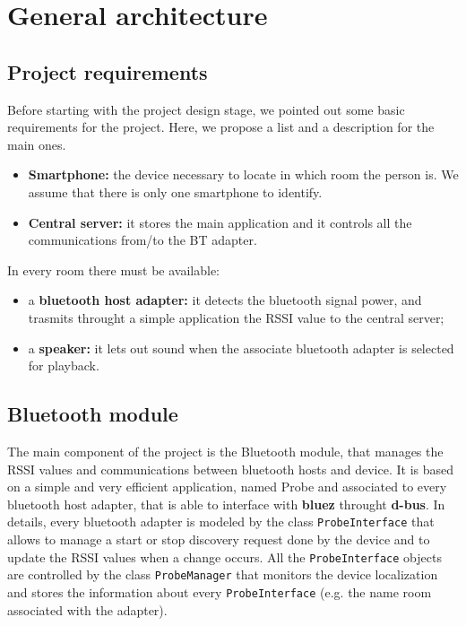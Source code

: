 \documentclass[conference]{./IEEEtran}
\begin{document}
\section{General architecture}

\subsection{Project requirements}
Before starting with the project design stage, we pointed out some basic requirements for the project. Here, we propose a list and a description for the main ones.
\begin{itemize}
\item{\textbf{Smartphone:}} the device necessary to locate in which room the person is. We assume that there is only one smartphone to identify.  
\item{\textbf{Central server:}} it stores the main application and it controls all the communications from/to the BT adapter.
\end{itemize}
In every room there must be available:
\begin{itemize}
\item{a \textbf{bluetooth host adapter:}} it detects the bluetooth signal power, and trasmits throught a simple application the RSSI value to the central server; 
\item{a \textbf{speaker:}} it lets out sound when the associate bluetooth adapter is selected for playback.
\end{itemize}


\subsection{Bluetooth module}
The main component of the project is the Bluetooth module, that manages the RSSI values and communications between bluetooth hosts and device. It is based on a simple and very efficient application, named Probe and associated to every bluetooth host adapter, that is able to interface with \textbf{bluez} throught \textbf{d-bus}. In details, every bluetooth adapter is modeled by the class \texttt{ProbeInterface} that allows to manage a start or stop discovery request done by the device and to update the RSSI values when a change occurs. All the \texttt{ProbeInterface} objects are controlled by the class \texttt{ProbeManager} that monitors the device localization and stores the information about every \texttt{ProbeInterface} (e.g. the name room associated with the adapter).     
\end{document}
